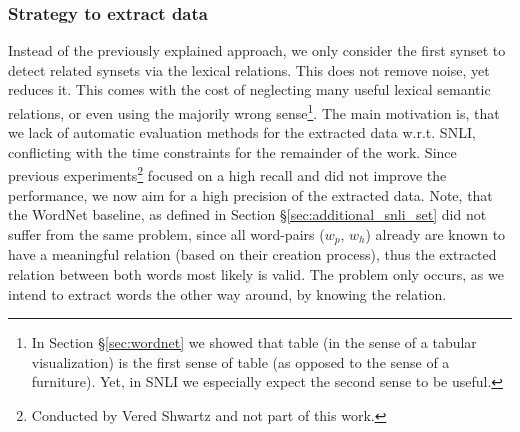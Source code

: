 \subsubsection{Strategy to extract data}\label{sec:used_wordnet_extract_strategy}
Instead of the previously explained approach, we only consider the first synset to detect related synsets via the lexical relations. This does not remove noise, yet reduces it. This comes with the cost of neglecting many useful lexical semantic relations, or even using the majorily wrong sense\footnote{In Section §\ref{sec:wordnet} we showed that table (in the sense of a tabular visualization) is the first sense of table (as opposed to the sense of a furniture). Yet, in \ac{SNLI} we especially expect the second sense to be useful.}. The main motivation is, that we lack of automatic evaluation methods for the extracted data w.r.t. \ac{SNLI}, conflicting with the time constraints for the remainder of the work. Since previous experiments\footnote{Conducted by Vered Shwartz and not part of this work.} focused on a high recall and did not improve the performance, we now aim for a high precision of the extracted data. Note, that the WordNet baseline, as defined in Section §\ref{sec:additional_snli_set} did not suffer from the same problem, since all word-pairs ($w_p$, $w_h$) already are known to have a meaningful relation (based on their creation process), thus the extracted relation between both words most likely is valid. The problem only occurs, as we intend to extract words the other way around, by knowing the relation.

